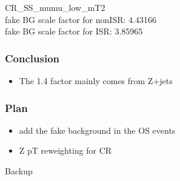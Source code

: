 \documentclass[mathserif,serif]{beamer}
\begin{document}






\begin{frame}
\begin{center}
\huge
CR\_SS\_mumu\_low\_mT2 \\
\small
fake BG scale factor for nonISR: 4.43166 \\
fake BG scale factor for ISR: 3.85965
\end{center}
\end{frame}





%

\begin{frame}
\frametitle{Conclusion}
\begin{itemize}
\item The 1.4 factor mainly comes from Z+jets
\end{itemize}
\end{frame}

\begin{frame}
\frametitle{Plan}
\begin{itemize}
\item add the fake background in the OS events
\item Z pT reweighting for CR
\end{itemize}
\end{frame}

\begin{frame}
\begin{center}
\huge
Backup
\end{center}
\end{frame}
\end{document}

